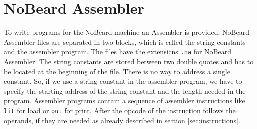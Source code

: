 \section{NoBeard Assembler}
To write programs for the NoBeard machine an Assembler is provided. NoBeard Assembler files are separated in two blocks, which is called the string constants and the assembler program. The files have the extensions \lstinline$.na$ for NoBeard Assembler. The string constants are stored between two double quotes and has to be located at the beginning of the file. There is no way to address a single constant. So, if we use a string constant in the assembler program, we have to specify the starting address of the string constant and the length needed in the program. Assembler programs  contain a sequence of assembler instructions like \lstinline$lit$ for load or \lstinline$out$ for print. After the opcode of the instruction follows the operands, if they are needed as already described in section \ref{sec:instructions}.